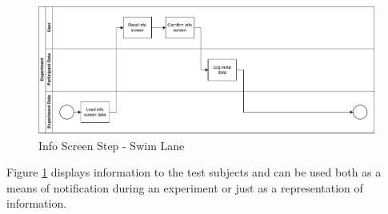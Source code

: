 \begin{figure}[htbp]
    \centering
    \includegraphics[width=0.99\textwidth, keepaspectratio]{content/05_design_and_dev_artefacts/InfoScreenSwimLane.drawio.pdf}
    \caption{Info Screen Step - Swim Lane}    
    \label{fig:infoScreenSwimLane}
\end{figure}

Figure \ref{fig:infoScreenSwimLane} displays information to the test subjects and can be used both as a means of notification during an experiment or just as a representation of information.




